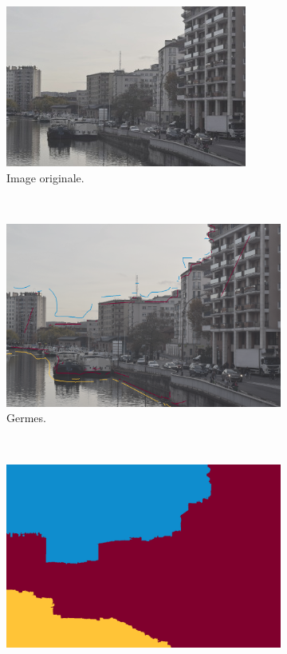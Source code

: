 \begin{figure}[htb]
 \centering
 \begin{subfigure}{0.6\textwidth}	
\includegraphics[width=\textwidth]{images/evaluation/img_manipulation_original}
\caption{Image originale.}
 \end{subfigure}
 \\
 \begin{subfigure}{0.45\textwidth}	
\includegraphics[width=\textwidth]{images/evaluation/img_manipulation_germes}
\caption{Germes.}
 \end{subfigure}
 ~
 \begin{subfigure}{0.45\textwidth}	
\includegraphics[width=\textwidth]{images/evaluation/img_manipulation_seg}

\end{subfigure}
\end{figure}
